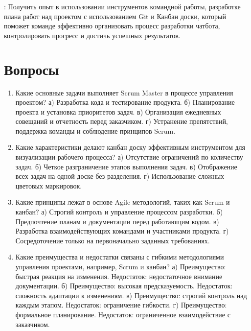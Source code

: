 \documentclass[letterpaper,10pt,russian]{sphinxmanual}
\begin{document}
\sphinxAtStartPar
{}: Получить опыт в использовании инструментов командной работы, разработке плана работ над проектом с использованием Git и Канбан доски, который поможет команде эффективно организовать процесс разработки чат\sphinxhyphen{}бота, контролировать прогресс и достичь успешных результатов.

\sphinxstepscope


\section{Вопросы}
\label{\detokenize{educational_materials/team_work_on_a_project/quiz:id1}}\label{\detokenize{educational_materials/team_work_on_a_project/quiz::doc}}\begin{enumerate}
%
\item {} 
\sphinxAtStartPar
Какие основные задачи выполняет Scrum Master в процессе управления проектом?
а) Разработка кода и тестирование продукта.
б) Планирование проекта и установка приоритетов задач.
в) Организация ежедневных совещаний и отчетность перед заказчиком.
г) Устранение препятствий, поддержка команды и соблюдение принципов Scrum.

\item {} 
\sphinxAtStartPar
Какие характеристики делают канбан доску эффективным инструментом для визуализации рабочего процесса?
а) Отсутствие ограничений по количеству задач.
б) Четкое разграничение этапов выполнения задач.
в) Отображение всех задач на одной доске без разделения.
г) Использование сложных цветовых маркировок.

\item {} 
\sphinxAtStartPar
Какие принципы лежат в основе Agile методологий, таких как Scrum и канбан?
а) Строгий контроль и управление процессом разработки.
б) Предпочтение планам и документации перед работающим кодом.
в) Разработка взаимодействующих командами и участниками продукта.
г) Сосредоточение только на первоначально заданных требованиях.

\item {} 
\sphinxAtStartPar
Какие преимущества и недостатки связаны с гибкими методологиями управления проектами, например, Scrum и канбан?
а) Преимущество: быстрая реакция на изменения. Недостаток: недостаточное внимание документации.
б) Преимущество: высокая предсказуемость. Недостаток: сложность адаптации к изменениям.
в) Преимущество: строгий контроль над каждым этапом. Недостаток: ограничение гибкости.
г) Преимущество: формальное планирование. Недостаток: ограниченное взаимодействие с заказчиком.


\end{enumerate}
\end{document}
